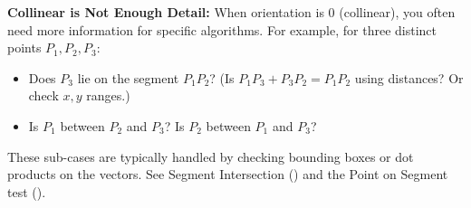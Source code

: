 \begin{warning}
\label{warn:A.1.4.collinear_subcases}
\textbf{Collinear is Not Enough Detail:}
When orientation is $0$ (collinear), you often need more information for specific algorithms. For example, for three distinct points $P_1, P_2, P_3$:
\begin{itemize}
    \item Does $P_3$ lie on the segment $P_1P_2$? (Is $P_1P_3 + P_3P_2 = P_1P_2$ using distances? Or check $x, y$ ranges.)
    \item Is $P_1$ between $P_2$ and $P_3$? Is $P_2$ between $P_1$ and $P_3$?
\end{itemize}
These sub-cases are typically handled by checking bounding boxes or dot products on the vectors. See Segment Intersection () and the Point on Segment test ().
\end{warning}